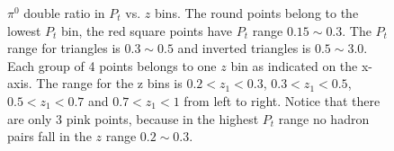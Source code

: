  \begin{figure}[H]
  \centering     
\caption{$\pi^0$ double ratio in $P_t$ vs. $z$ bins. The round points belong to the lowest $P_t$ bin, the red square points have $P_t$ range $0.15\sim 0.3$. The $P_t$ range for triangles is $0.3\sim 0.5$ and inverted triangles is $0.5\sim 3.0$. Each group of 4 points belongs to one $z$ bin as indicated on the x-axis. The range for the z bins is $0.2<z_1<0.3$,  $0.3<z_1<0.5$, $0.5<z_1<0.7$ and $0.7<z_1<1$ from left to right. Notice that there are only 3 pink points, because in the highest $P_t$ range no hadron pairs fall in the $z$ range $0.2\sim 0.3$.}
  \label{fig:ptzresult}
\end{figure}
